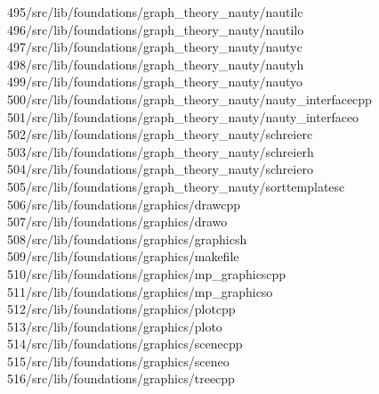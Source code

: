 \begin{tabbing}
495\>/src/lib/foundations/graph\_theory\_nauty/nautilc\\[0pt]
496\>/src/lib/foundations/graph\_theory\_nauty/nautilo\\[0pt]
497\>/src/lib/foundations/graph\_theory\_nauty/nautyc\\[0pt]
498\>/src/lib/foundations/graph\_theory\_nauty/nautyh\\[0pt]
499\>/src/lib/foundations/graph\_theory\_nauty/nautyo\\[0pt]
500\>/src/lib/foundations/graph\_theory\_nauty/nauty\_interfacecpp\\[0pt]
501\>/src/lib/foundations/graph\_theory\_nauty/nauty\_interfaceo\\[0pt]
502\>/src/lib/foundations/graph\_theory\_nauty/schreierc\\[0pt]
503\>/src/lib/foundations/graph\_theory\_nauty/schreierh\\[0pt]
504\>/src/lib/foundations/graph\_theory\_nauty/schreiero\\[0pt]
505\>/src/lib/foundations/graph\_theory\_nauty/sorttemplatesc\\[0pt]
506\>/src/lib/foundations/graphics/drawcpp\\[0pt]
507\>/src/lib/foundations/graphics/drawo\\[0pt]
508\>/src/lib/foundations/graphics/graphicsh\\[0pt]
509\>/src/lib/foundations/graphics/makefile\\[0pt]
510\>/src/lib/foundations/graphics/mp\_graphicscpp\\[0pt]
511\>/src/lib/foundations/graphics/mp\_graphicso\\[0pt]
512\>/src/lib/foundations/graphics/plotcpp\\[0pt]
513\>/src/lib/foundations/graphics/ploto\\[0pt]
514\>/src/lib/foundations/graphics/scenecpp\\[0pt]
515\>/src/lib/foundations/graphics/sceneo\\[0pt]
516\>/src/lib/foundations/graphics/treecpp\\[0pt]

\end{tabbing}
